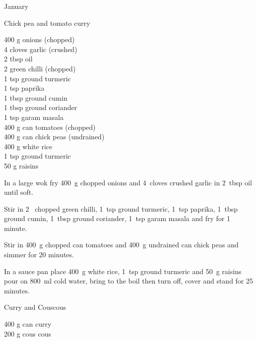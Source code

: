 \begin{menu}{January}
    \begin{recipe}{2}{Chick pea and tomato curry}%
		\begin{ingredients}
		400 g onions (chopped) \\
	4 cloves garlic (crushed) \\
	2 tbsp oil  \\
	2  green chilli (chopped) \\
	1 tsp ground turmeric  \\
	1 tsp paprika  \\
	1 tbsp ground cumin  \\
	1 tbsp ground coriander  \\
	1 tsp garam masala  \\
	400 g can tomatoes (chopped) \\
	400 g can chick peas (undrained) \\
	400 g white rice  \\
	1 tsp ground turmeric  \\
	50 g raisins  \\
	
		\end{ingredients}
	
	
    \begin{instructions}
    \item 
        In a large wok fry
        400~g chopped onions
        and
        4~cloves crushed garlic
        in
        2~tbsp  oil
        until soft.
      \item 
        Stir in
        2~ chopped green chilli,
        1~tsp  ground turmeric,
        1~tsp  paprika,
        1~tbsp  ground cumin,
        1~tbsp  ground coriander,
        1~tsp  garam masala
        and fry for 1 minute.
      \item 
        Stir in
        400~g chopped can tomatoes
        and
        400~g undrained can chick peas
        and simmer for 20 minutes.
      \item 
      In a
      sauce pan
      place
      400~g  white rice,
      1~tsp  ground turmeric
      and
      50~g  raisins
      pour on
      800~ml  cold water,
      bring to the boil then turn off, cover and stand for 25 minutes.
    
    \end{instructions}
    \end{recipe}%
  
    \begin{recipe}{1}{Curry and Couscous}%
		\begin{ingredients}
		400 g can curry  \\
	200 g cous cous  \\
	

\end{ingredients}
\end{recipe}
\end{menu}
